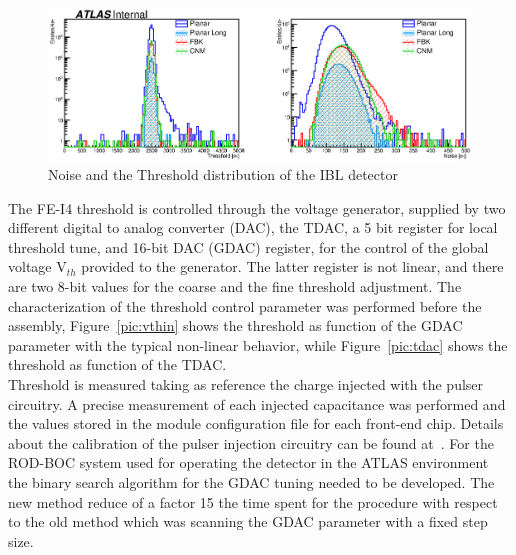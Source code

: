 \begin{figure}
\centering
\includegraphics[width=1.\textwidth]{Images/IBL_commissioning/ThrDistro49451.eps}
\caption{Noise and the Threshold distribution of the IBL detector}
\label{pic:thr_map}
\end{figure}
The FE-I4 threshold is controlled through the voltage generator, supplied by two different digital to analog converter (DAC), the TDAC, a 5 bit register for local threshold tune, and 16-bit DAC (GDAC) register, for the control of the global voltage V$_{th}$ provided to the generator. The latter register is not linear, and there are two 8-bit values for the coarse and the fine threshold adjustment. The characterization of the threshold control parameter was performed before the assembly, Figure~\ref{pic:vthin} shows the threshold as function of the GDAC parameter with the typical non-linear behavior, while Figure~\ref{pic:tdac} shows the threshold as function of the TDAC.\\
Threshold is measured taking as reference the charge injected with the pulser circuitry. A precise measurement of each injected capacitance was performed and the values stored in the module configuration file for each front-end chip. Details about the calibration of the pulser injection circuitry can be found at~\cite{Malte_thesis}. 
For the ROD-BOC system used for operating the detector in the ATLAS environment the binary search algorithm for the GDAC tuning needed to be developed. The new method reduce of a factor 15 the time spent for the procedure with respect to the old method which was scanning the GDAC parameter with a fixed step size.

